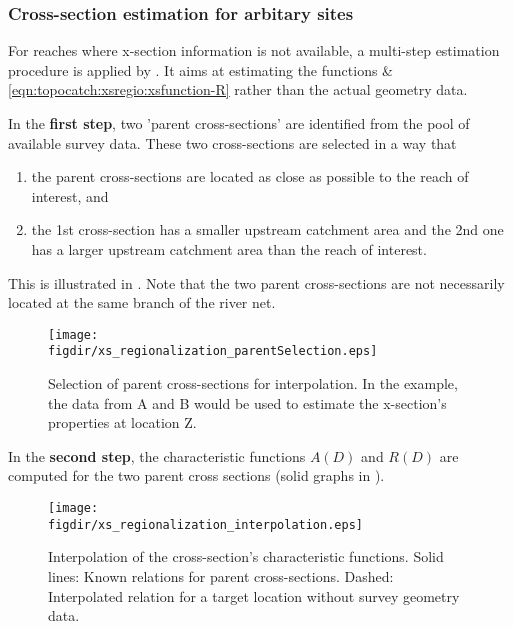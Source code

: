 \subsubsection*{Cross-section estimation for arbitary sites}
For reaches where x-section information is not available, a multi-step estimation procedure is applied by . It aims at estimating the functions  \& \ref{eqn:topocatch:xsregio:xsfunction-R} rather than the actual geometry data.

In the \textbf{first step}, two 'parent cross-sections' are identified from the pool of available survey data. These two cross-sections are selected in a way that
\begin{enumerate}
  \item the parent cross-sections are located as close as possible to the reach of interest, and
  \item the 1st cross-section has a smaller upstream catchment area and the 2nd one has a larger upstream catchment area than the reach of interest.
\end{enumerate}

This is illustrated in . Note that the two parent cross-sections are not necessarily located at the same branch of the river net.

\begin{figure}
  \centering
  \texttt{[image: \\figdir/xs\_regionalization\_parentSelection.eps]}
  \caption[Selection of parent cross-sections for interpolation.]{Selection of parent cross-sections for interpolation. In the example, the data from A and B would be used to estimate the x-section's properties at location Z. \label{fig:topocatch:xsregio:regionalization_parentSelection}}
\end{figure}

In the \textbf{second step}, the characteristic functions $A(D)$ and $R(D)$ are computed for the two parent cross sections (solid graphs in ).

\begin{figure}
  \centering
  \texttt{[image: \\figdir/xs\_regionalization\_interpolation.eps]}
  \caption[Interpolation of the cross-section's characteristic functions.]{Interpolation of the cross-section's characteristic functions. Solid lines: Known relations for parent cross-sections. Dashed: Interpolated relation for a target location without survey geometry data. \label{fig:topocatch:xsregio:regionalization_interpolation}}
\end{figure}

